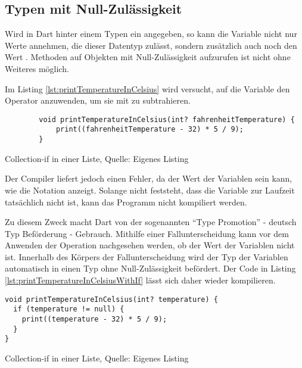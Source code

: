 \subsection{Typen mit Null-Zulässigkeit}
\label{sec:TypenMitNullZulaessigkeit}

Wird in Dart hinter einem Typen ein  angegeben, so kann die Variable nicht nur  Werte annehmen, die dieser Datentyp zulässt, sondern zusätzlich auch noch den Wert .
Methoden auf Objekten mit Null-Zulässigkeit aufzurufen ist nicht ohne Weiteres möglich.

Im Listing \ref{lst:printTemperatureInCelsius}
wird versucht, auf die Variable  den Operator \IC{-} anzuwenden, um sie mit  zu subtrahieren.


\ifIncludeFigures
  \begin{listing}[ht]
    \begin{verbatim}
        void printTemperatureInCelsius(int? fahrenheitTemperature) {
            print((fahrenheitTemperature - 32) * 5 / 9);
        }
\end{verbatim}
    \caption[Collection-if in einer Liste]{Collection-if in einer Liste, Quelle: Eigenes Listing}
    \label{lst:printTemperatureInCelsius}
  \end{listing}
\fi

Der Compiler liefert jedoch einen Fehler, da der Wert der Variablen  sein kann, wie die Notation  anzeigt.
Solange nicht feststeht, dass die Variable zur Laufzeit tatsächlich nicht  ist, kann das Programm nicht kompiliert werden.


Zu diesem Zweck macht Dart von der sogenannten \enquote{Type Promotion} - deutsch Typ Beförderung - Gebrauch.
Mithilfe einer Fallunterscheidung kann vor dem Anwenden der Operation nachgesehen werden, ob der Wert der Variablen nicht  ist.
Innerhalb des Körpers der Fallunterscheidung wird der Typ der Variablen automatisch in einen Typ ohne Null-Zulässigkeit befördert.
Der Code in Listing \ref{lst:printTemperatureInCelsiusWithIf} lässt sich daher wieder kompilieren.

\ifIncludeFigures
  \begin{listing}[ht]
    \begin{verbatim}
void printTemperatureInCelsius(int? temperature) {
  if (temperature != null) {
    print((temperature - 32) * 5 / 9);
  }
}
\end{verbatim}
    \caption[Collection-if in einer Liste]{Collection-if in einer Liste, Quelle: Eigenes Listing}
    \label{lst:printTemperatureInCelsiusWithIf}
  \end{listing}
\fi

